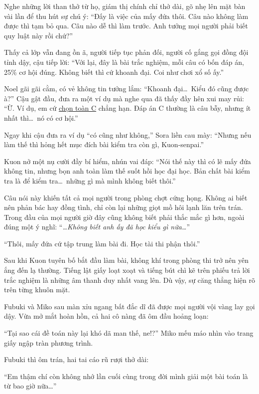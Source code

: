 \documentclass[../main.tex]{subfiles}
\begin{document}
Nghe những lời than thở từ họ, giám thị chính chỉ thở dài, gõ nhẹ lên mặt bàn vài lần để thu hút sự chú ý: ``Đấy là việc của mấy đứa thôi. Câu nào không làm được thì tạm bỏ qua. Câu nào dễ thì làm trước. Anh tưởng mọi người phải biết quy luật này rồi chứ?''

Thấy cả lớp vẫn đang ồn ã, người tiếp tục phản đối, người cố gắng gọi đồng đội tỉnh dậy, cậu tiếp lời: ``Với lại, đây là bài trắc nghiệm, mỗi câu có bốn đáp án, 25\% cơ hội đúng. Không biết thì cứ khoanh đại. Coi như chơi xổ số ấy.''

Noel gãi gãi cằm, có vẻ không tin tưởng lắm: ``Khoanh đại\dots\ Kiểu đó cũng được à?'' Cậu gật đầu, đưa ra một ví dụ mà nghe qua đã thấy đầy hên xui may rủi: ``Ừ. Ví dụ, em cứ \href{https://www.facebook.com/watch/?v=445235674120478}{chọn toàn C} chẳng hạn. Đáp án C thường là câu bẫy, nhưng ít nhất thì\dots\ nó có cơ hội.''

Ngay khi cậu đưa ra ví dụ ``có cũng như không,'' Sora liền cau mày: ``Nhưng nếu làm thế thì hỏng hết mục đích bài kiểm tra còn gì, Kuon-senpai.''

Kuon nở một nụ cười đầy bí hiểm, nhún vai đáp: ``Nói thế này thì có lẽ mấy đứa không tin, nhưng bọn anh toàn làm thế suốt hồi học đại học. Bản chất bài kiểm tra là để kiểm tra\dots\ những gì mà mình không biết thôi.''

Câu nói này khiến tất cả mọi người trong phòng chợt cứng họng. Không ai biết nên phản bác hay đồng tình, chỉ còn lại những giọt mồ hôi lạnh lăn trên trán. Trong đầu của mọi người giờ đây cũng không biết phải thắc mắc gì hơn, ngoài đúng một ý nghĩ: ``\textit{\dots Không biết anh ấy đã học kiểu gì nữa\dots}''

``Thôi, mấy đứa cứ tập trung làm bài đi. Học tài thi phận thôi.''

Sau khi Kuon tuyên bố bắt đầu làm bài, không khí trong phòng thi trở nên yên ắng đến lạ thường. Tiếng lật giấy loạt xoạt và tiếng bút chì kẽ trên phiếu trả lời trắc nghiệm là những âm thanh duy nhất vang lên. Dù vậy, sự căng thẳng hiện rõ trên từng khuôn mặt.

Fubuki và Miko sau màn xỉu ngang bất đắc dĩ đã được mọi người vội vàng lay gọi dậy. Vừa mở mắt hoàn hồn, cả hai cô nàng đã ôm đầu hoảng loạn:

``Tại sao cái đề toán này lại khó dã man thế, ne!?'' Miko mếu máo nhìn vào trang giấy ngập tràn phương trình.

Fubuki thì ôm trán, hai tai cáo rũ rượi thở dài:

``Em thậm chí còn không nhớ lần cuối cùng trong đời mình giải một bài toán là từ bao giờ nữa\dots''
\end{document}
